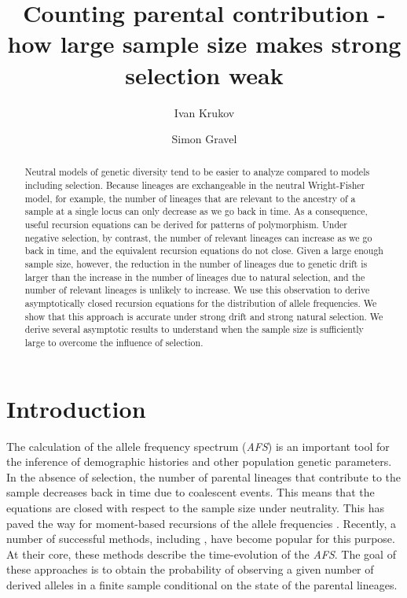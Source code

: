 \documentclass[review]{elsarticle}
\begin{document}
\begin{frontmatter}
  \title{Counting parental contribution - how large sample size makes strong selection weak}

  \author{Ivan Krukov}
  \author{Simon Gravel}

  \begin{abstract}
    Neutral models of genetic diversity tend to be easier to analyze compared to models including
    selection. Because lineages are exchangeable in the neutral Wright-Fisher model, for example,
    the number of lineages that are relevant to the ancestry of a sample at a single locus can only
    decrease as we go back in time. As a consequence, useful recursion equations can be derived for
    patterns of polymorphism. Under negative selection, by contrast, the number of relevant lineages
    can increase as we go back in time, and the equivalent recursion equations do not close. Given a
    large enough sample size, however, the reduction in the number of lineages due to genetic drift
    is larger than the increase in the number of lineages due to natural selection, and the number
    of relevant lineages is unlikely to increase. We use this observation to derive asymptotically
    closed recursion equations for the distribution of allele frequencies. We show that this
    approach is accurate under strong drift and strong natural selection. We derive several
    asymptotic results to understand when the sample size is sufficiently large to overcome the
    influence of selection.
    
  \end{abstract}
\end{frontmatter}

\section{Introduction}
\label{sec:introduciton}

The calculation of the allele frequency spectrum (\textit{AFS}) is an important tool for the inference
of demographic histories and other population genetic parameters. In the absence of selection, the
number of parental lineages that contribute to the sample decreases back in time due to coalescent
events. This means that the equations are closed with respect to the sample size under neutrality.
This has paved the way for moment-based recursions of the allele frequencies
\cite{KimuraCrow1964,Ewens1972,DonnellyKurtz1999}. Recently, a number of successful methods,
including \cite{GutenkunstEtAl2009,JouganousEtAl2017,KammEtAl2017}, have become popular for this
purpose. At their core, these methods describe the time-evolution of the \textit{AFS}. The goal of
these approaches is to obtain the probability of observing a given number of derived alleles in a
finite sample conditional on the state of the parental lineages.
\end{document}
